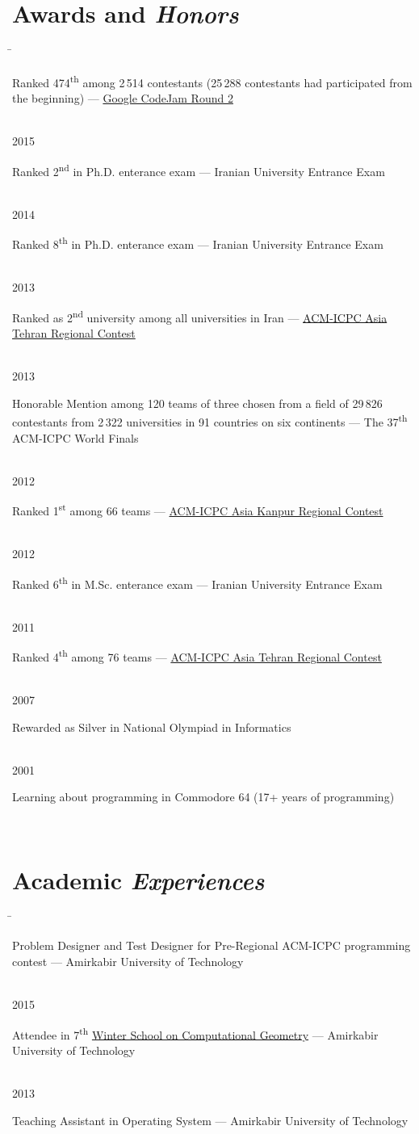 \documentclass[a4paper,10pt]{article}
\newcommand{\supersc}[1]{\textsuperscript{#1}}
\newcommand{\follownote}[1]{--- {\footnotesize\color{darkblue}#1}}
\newcommand{\acmicpcnote}[2]{--- {\footnotesize\color{darkblue}
	\href{https://icpc.baylor.edu/regionals/finder/#1/standings}
	{#2}
}}
\newcommand{\codejamnote}[3]{--- {\footnotesize\color{darkblue}
	\href{https://code.google.com/codejam/contest/#1/scoreboard#2}
	{#3}
}}
\begin{document}
\section*{{\color{orange}Awards and \emph{Honors}}}
\begin{tabbing}
\hspace{1.5cm}\= \>\parbox[t]{11.5cm}{
	Ranked 474\supersc{th} among 2\,514 contestants
	(25\,288 contestants had participated from the beginning)
	\codejamnote{5314486}{\#sp=451}{Google CodeJam Round 2}
} \\[2mm]
2015 \>\parbox[t]{11.5cm}{
	Ranked 2\supersc{nd} in Ph.D. enterance exam
	\follownote{Iranian University Entrance Exam}
} \\[2mm]
2014 \>\parbox[t]{11.5cm}{
	Ranked 8\supersc{th} in Ph.D. enterance exam
	\follownote{Iranian University Entrance Exam}
} \\[2mm]
2013 \>\parbox[t]{11.5cm}{
	Ranked as 2\supersc{nd} university among all
	universities in Iran
	\acmicpcnote{Tehran-2013}
	{ACM-ICPC Asia Tehran Regional Contest}
} \\[2mm]
2013 \>\parbox[t]{11.5cm}{
	Honorable Mention among 120 teams of three chosen from a
	field of 29\,826 contestants from 2\,322 universities in 91
	countries on six continents
	\follownote{The 37\supersc{th} ACM-ICPC World Finals}
} \\[2mm]
2012 \>\parbox[t]{11.5cm}{
	Ranked 1\supersc{st} among 66 teams
	\acmicpcnote{Kanpur-2012}
	{ACM-ICPC Asia Kanpur Regional Contest}
} \\[2mm]
2012 \>\parbox[t]{11.5cm}{
	Ranked 6\supersc{th} in M.Sc. enterance exam
	\follownote{Iranian University Entrance Exam}
} \\[2mm]
2011 \>\parbox[t]{11.5cm}{
	Ranked 4\supersc{th} among 76 teams 
	\acmicpcnote{Tehran-2011}
	{ACM-ICPC Asia Tehran Regional Contest}
} \\[2mm]
2007 \>\parbox[t]{11.5cm}{
	Rewarded as Silver in National Olympiad in Informatics
} \\[2mm]
2001 \>\parbox[t]{11.5cm}{
	Learning about programming in Commodore 64
	(17+ years of programming)
} \\[2mm]
\end{tabbing}

\section*{{\color{green}Academic \emph{Experiences}}}
\begin{tabbing}
\hspace{1.5cm}\= \>\parbox[t]{11.5cm}{
	Problem Designer and Test Designer for Pre-Regional ACM-ICPC
	programming contest
	\follownote{Amirkabir University of Technology}
} \\[2mm]
2015 \>\parbox[t]{11.5cm}{
	Attendee in 7\supersc{th} \href{http://wscg.aut.ac.ir}
	{Winter School on Computational Geometry}
	\follownote{Amirkabir University of Technology}
} \\[2mm]
2013 \>\parbox[t]{11.5cm}{
	Teaching Assistant in Operating System
	\follownote{Amirkabir University of Technology}
} \\[2mm]
\end{tabbing}
\end{document}
